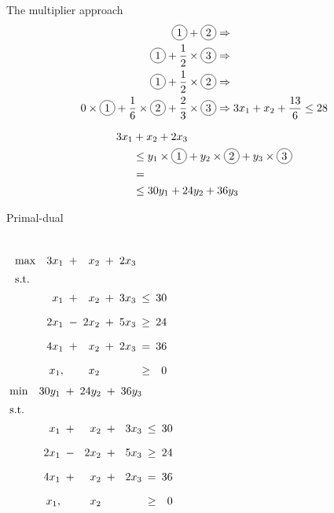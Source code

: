 \begin{frame}{The multiplier approach}
  \begin{align*}
	\circled{1} + \circled{2} &\Rightarrow	\\
	\circled{1} + \frac{1}{2} \times \circled{3} &\Rightarrow \\
	\circled{1} + \frac{1}{2} \times \circled{2} &\Rightarrow \\
	0 \times \circled{1} + \frac{1}{6} \times \circled{2} + \frac{2}{3} \times \circled{3} &\Rightarrow 3x_1 + x_2 + \frac{13}{6} \leq 28
  \end{align*}

  \begin{align*}
	3x_1 &+ x_2 + 2x_3	\\
		&\leq y_1 \times \circled{1} + y_2 \times \circled{2} + y_3 \times \circled{3} \\
		&=	\\
		&\leq 30y_1 + 24y_2 + 36y_3
  \end{align*}
\end{frame}
\begin{frame}{Primal-dual }
  \begin{columns}
	  \begin{equation*}
		\setlength\arraycolsep{2.5pt}
		\begin{array}{l@{\quad}rcrcrcr}
		  \max 	& 3x_1  &+&	x_2		&+&	2x_3	&	&	\\[5pt]
		  \text{s.t.} 	&	&	&	&	&	&	&	\\[5pt]
				& x_1   	&+&	x_2	&+&	3x_3	&\leq& 30 \\[10pt]
				& 2x_1	&-&	2x_2 	&+& 5x_3 	&\geq& 24 \\[10pt]
				& 4x_1   	&+&	x_2		&+&	2x_3	&=& 36	\\[10pt]
				& x_1,	&&	x_2	&&	&\geq&	0
		\end{array}
	  \end{equation*}
	  \begin{equation*}
		\setlength\arraycolsep{2.5pt}
		\begin{array}{l@{\quad}rcrcrcr}
		  \min 	& 30y_1  &+&	24y_2		&+&	36y_3	&	&	\\[5pt]
		  \text{s.t.} 	&	&	&	&	&	&	&	\\[5pt]
				& x_1   	&+&	x_2	&+&	3x_3	&\leq& 30 \\[10pt]
				& 2x_1	&-&	2x_2 	&+& 5x_3 	&\geq& 24 \\[10pt]
				& 4x_1   	&+&	x_2		&+&	2x_3	&=& 36	\\[10pt]
				& x_1,	&&	x_2	&&	&\geq&	0
		\end{array}
	  \end{equation*}
  \end{columns}
\end{frame}
